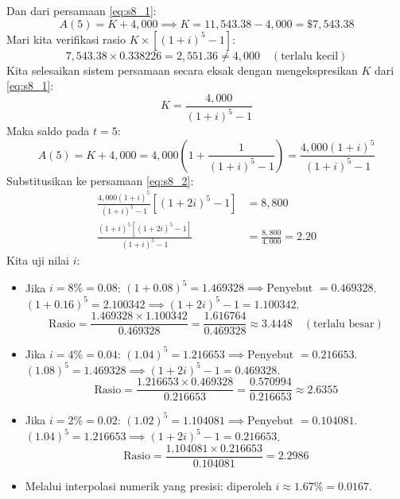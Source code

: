 \documentclass[11pt,a4paper]{article}
\begin{document}
\begin{solutionbox}[Soal 8]
\begin{enumerate}[label=(\alph*)]
\begin{equation*}
    \end{equation*}
    Dan dari persamaan \eqref{eq:s8_1}:
    \begin{equation*}
        A(5) = K + 4{,}000 \implies K = 11{,}543.38 - 4{,}000 = \$7{,}543.38
    \end{equation*}
    Mari kita verifikasi rasio $K \times [(1+i)^5 - 1]$:
    \begin{equation*}
        7{,}543.38 \times 0.338226 = 2{,}551.36 \neq 4{,}000 \quad (\text{terlalu kecil})
    \end{equation*}
    Kita selesaikan sistem persamaan secara eksak dengan mengekspresikan $K$ dari \eqref{eq:s8_1}:
    \begin{equation*}
        K = \frac{4{,}000}{(1+i)^5 - 1}
    \end{equation*}
    Maka saldo pada $t = 5$:
    \begin{equation*}
        A(5) = K + 4{,}000 = 4{,}000\left(1 + \frac{1}{(1+i)^5 - 1}\right) = \frac{4{,}000(1+i)^5}{(1+i)^5 - 1}
    \end{equation*}
    Substitusikan ke persamaan \eqref{eq:s8_2}:
    \begin{align*}
        \frac{4{,}000(1+i)^5}{(1+i)^5 - 1} \left[(1+2i)^5 - 1\right] &= 8{,}800 \\[0.4em]
        \frac{(1+i)^5 \left[(1+2i)^5 - 1\right]}{(1+i)^5 - 1} &= \frac{8{,}800}{4{,}000} = 2.20
    \end{align*}
    Kita uji nilai $i$:
    \begin{itemize}
        \item Jika $i = 8\% = 0.08$:
        $(1+0.08)^5 = 1.469328 \implies \text{Penyebut } = 0.469328$.
        $(1+0.16)^5 = 2.100342 \implies (1+2i)^5 - 1 = 1.100342$.
        \begin{equation*}
            \text{Rasio} = \frac{1.469328 \times 1.100342}{0.469328} = \frac{1.616764}{0.469328} \approx \mathbf{3.4448} \quad (\text{terlalu besar})
        \end{equation*}
        \item Jika $i = 4\% = 0.04$:
        $(1.04)^5 = 1.216653 \implies \text{Penyebut } = 0.216653$.
        $(1.08)^5 = 1.469328 \implies (1+2i)^5 - 1 = 0.469328$.
        \begin{equation*}
            \text{Rasio} = \frac{1.216653 \times 0.469328}{0.216653} = \frac{0.570994}{0.216653} \approx \mathbf{2.6355}
        \end{equation*}
        \item Jika $i = 2\% = 0.02$:
        $(1.02)^5 = 1.104081 \implies \text{Penyebut } = 0.104081$.
        $(1.04)^5 = 1.216653 \implies (1+2i)^5 - 1 = 0.216653$.
        \begin{equation*}
            \text{Rasio} = \frac{1.104081 \times 0.216653}{0.104081} = \mathbf{2.2986}
        \end{equation*}
        \item Melalui interpolasi numerik yang presisi: diperoleh $i \approx \mathbf{1.67\%} = 0.0167$.
    \end{itemize}


\end{enumerate}
\end{solutionbox}
\end{document}
